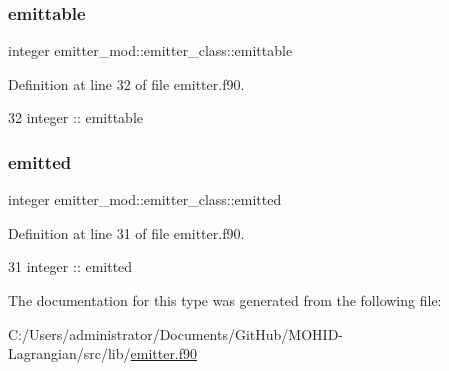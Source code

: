 \subsubsection{\texorpdfstring{emittable}{emittable}}
{\footnotesize\ttfamily integer emitter\+\_\+mod\+::emitter\+\_\+class\+::emittable\hspace{0.3cm}{\ttfamily [private]}}



Definition at line 32 of file emitter.\+f90.


\begin{DoxyCode}
32         \textcolor{keywordtype}{integer} :: emittable
\end{DoxyCode}
\mbox{\label{structemitter__mod_1_1emitter__class_aa8f56d34f32e452a2e78f93f44780b4b}} 
\subsubsection{\texorpdfstring{emitted}{emitted}}
{\footnotesize\ttfamily integer emitter\+\_\+mod\+::emitter\+\_\+class\+::emitted\hspace{0.3cm}{\ttfamily [private]}}



Definition at line 31 of file emitter.\+f90.


\begin{DoxyCode}
31         \textcolor{keywordtype}{integer} :: emitted
\end{DoxyCode}


The documentation for this type was generated from the following file\+:\begin{DoxyCompactItemize}
\item 
C\+:/\+Users/administrator/\+Documents/\+Git\+Hub/\+M\+O\+H\+I\+D-\/\+Lagrangian/src/lib/\mbox{\hyperlink{emitter_8f90}{emitter.\+f90}}\end{DoxyCompactItemize}
